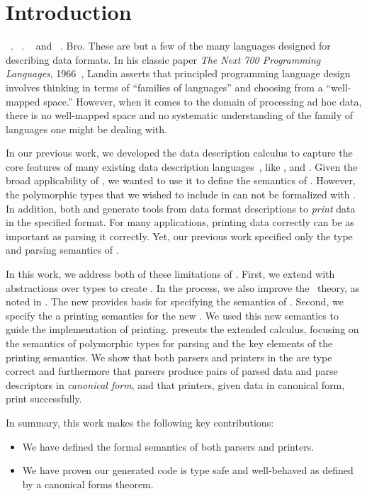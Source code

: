 \section{Introduction}
\label{sec:intro}

\datascript{}~\cite{gpce02}. \packettypes{}~\cite{sigcomm00}. \padsc{}~\cite{fisher+:pads}
and \padsml{}~\cite{mandelbaum+:padsml}. Bro\cite{paxson:bro}. These
are but a few of the many languages designed for describing data
formats. In his classic paper {\em The Next 700 Programming
  Languages}, 1966~\cite{landin:700}, Landin asserts that principled
programming language design involves thinking in terms of ``families
of languages'' and choosing from a ``well-mapped space.''  However,
when it comes to the domain of processing ad hoc data, there is no
well-mapped space and no systematic understanding of the family of
languages one might be dealing with.

In our previous work, we developed the data description calculus
\ddcold{} to capture the core features of many existing data
description languages~\cite{fisher+:next700ddl}, like \padsc{},
\packettypes{} and \datascript{}. Given the broad applicability of
\ddcold{}, we wanted to use it to define the semantics of
\padsml{}. However, the polymorphic types that we wished to include in
\padsml{} can not be formalized with \ddcold{}.  In addition, both
\padsc{} and \padsml{} generate tools from data format descriptions to
{\em print} data in the specified format. For
many applications, printing data correctly can be as important as
parsing it correctly. Yet, our previous work
specified only the type and parsing semantics of \ddcold{}. 

In this work, we address both of these limitations of
\ddcold{}. First, we extend \ddcold{} with abstractions over types to
create \ddc. In the process, we also improve the \ddc\ theory, as
noted in . The new \ddc provides basis for
specifying the semantics of \padsml{}. Second, we specify the a
printing semantics for the new \ddc{}.  We used this new
semantics to guide the \padsml{} implementation of printing.
 presents the extended \ddc{} calculus, focusing on
the semantics of polymorphic types for parsing and the key elements of
the printing semantics.  We show that both parsers and printers in the
\ddc{} are type correct and furthermore that parsers produce pairs of
parsed data and parse descriptors in {\em canonical form}, and that
printers, given data in canonical form, print successfully.

In summary, this work makes the following key contributions:
\begin{itemize}
\item We have defined the formal semantics of both \padsml{} parsers 
and printers. 
\item We have proven our generated code is type safe and
well-behaved as defined by a canonical forms theorem.
\end{itemize}

